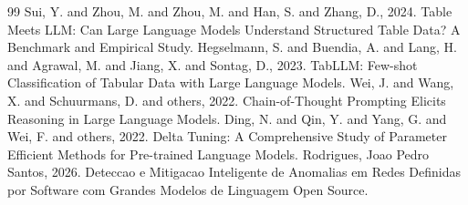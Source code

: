 \documentclass[12pt,a4paper]{article}
\begin{document}
\begin{thebibliography}{99}
 Sui, Y. and Zhou, M. and Zhou, M. and Han, S. and Zhang, D., 2024. Table Meets LLM: Can Large Language Models Understand Structured Table Data? A Benchmark and Empirical Study.
 Hegselmann, S. and Buendia, A. and Lang, H. and Agrawal, M. and Jiang, X. and Sontag, D., 2023. TabLLM: Few-shot Classification of Tabular Data with Large Language Models.
 Wei, J. and Wang, X. and Schuurmans, D. and others, 2022. Chain-of-Thought Prompting Elicits Reasoning in Large Language Models.
 Ding, N. and Qin, Y. and Yang, G. and Wei, F. and others, 2022. Delta Tuning: A Comprehensive Study of Parameter Efficient Methods for Pre-trained Language Models.
 Rodrigues, Joao Pedro Santos, 2026. Deteccao e Mitigacao Inteligente de Anomalias em Redes Definidas por Software com Grandes Modelos de Linguagem Open Source.
\end{thebibliography}
\end{document}
